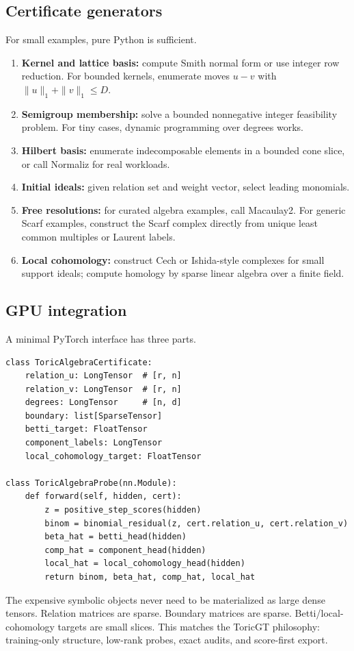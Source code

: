 \documentclass[11pt]{article}
\theoremstyle{definition}
\begin{document}
\subsection{Certificate generators}
For small examples, pure Python is sufficient.
\begin{enumerate}[leftmargin=*]
\item \textbf{Kernel and lattice basis:} compute Smith normal form or use integer row reduction.  For bounded kernels, enumerate moves \(u-v\) with \(\|u\|_1+\|v\|_1\le D\).
\item \textbf{Semigroup membership:} solve a bounded nonnegative integer feasibility problem.  For tiny cases, dynamic programming over degrees works.
\item \textbf{Hilbert basis:} enumerate indecomposable elements in a bounded cone slice, or call Normaliz for real workloads.
\item \textbf{Initial ideals:} given relation set and weight vector, select leading monomials.
\item \textbf{Free resolutions:} for curated algebra examples, call Macaulay2.  For generic Scarf examples, construct the Scarf complex directly from unique least common multiples or Laurent labels.
\item \textbf{Local cohomology:} construct Cech or Ishida-style complexes for small support ideals; compute homology by sparse linear algebra over a finite field.
\end{enumerate}

\subsection{GPU integration}
A minimal PyTorch interface has three parts.
\begin{verbatim}
class ToricAlgebraCertificate:
    relation_u: LongTensor  # [r, n]
    relation_v: LongTensor  # [r, n]
    degrees: LongTensor     # [n, d]
    boundary: list[SparseTensor]
    betti_target: FloatTensor
    component_labels: LongTensor
    local_cohomology_target: FloatTensor

class ToricAlgebraProbe(nn.Module):
    def forward(self, hidden, cert):
        z = positive_step_scores(hidden)
        binom = binomial_residual(z, cert.relation_u, cert.relation_v)
        beta_hat = betti_head(hidden)
        comp_hat = component_head(hidden)
        local_hat = local_cohomology_head(hidden)
        return binom, beta_hat, comp_hat, local_hat
\end{verbatim}
The expensive symbolic objects never need to be materialized as large dense tensors.  Relation matrices are sparse.  Boundary matrices are sparse.  Betti/local-cohomology targets are small slices.  This matches the ToricGT philosophy: training-only structure, low-rank probes, exact audits, and score-first export.
\end{document}
